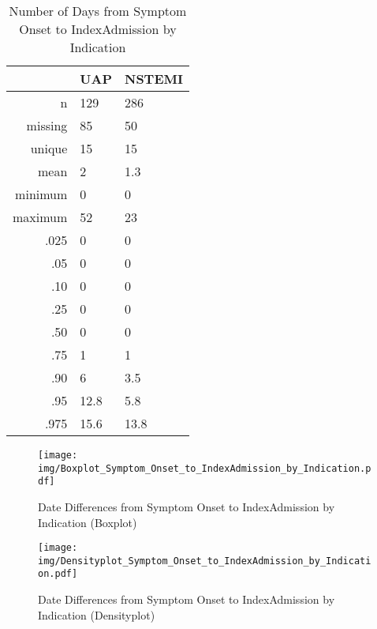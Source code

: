 \documentclass[presentation,xcolor=pdftex,dvipsnames,table,11pt]{beamer}
\begin{document}
\begin{tiny}
\begin{table}[ht]
\centering
\begin{tabular}{rll}
  \toprule
 & UAP & NSTEMI \\ 
  \midrule
n & 129 & 286 \\ 
  missing & 85 & 50 \\ 
  unique & 15 & 15 \\ 
  mean & 2 & 1.3 \\ 
  minimum & 0 & 0 \\ 
  maximum & 52 & 23 \\ 
  .025 & 0 & 0 \\ 
  .05 & 0 & 0 \\ 
  .10 & 0 & 0 \\ 
  .25 & 0 & 0 \\ 
  .50 & 0 & 0 \\ 
  .75 & 1 & 1 \\ 
  .90 & 6 & 3.5 \\ 
  .95 & 12.8 & 5.8 \\ 
  .975 & 15.6 & 13.8 \\ 
   \bottomrule
\end{tabular}
\caption{Number of Days from Symptom Onset to IndexAdmission by Indication} 
\end{table}
\begin{frame}
\begin{figure}
  \centering
  \caption{Date Differences from Symptom Onset to IndexAdmission by Indication (Boxplot)}
  \label{Boxplot: Date Differences from Symptom Onset to IndexAdmission by Indication}
\texttt{[image: img/Boxplot\_Symptom\_Onset\_to\_IndexAdmission\_by\_Indication.pdf]}\end{figure}
\end{frame}


\begin{frame}
\begin{figure}
  \centering
  \caption{Date Differences from Symptom Onset to IndexAdmission by Indication (Densityplot)}
  \label{Density: Date Differences from Symptom Onset to IndexAdmission by Indication}
\texttt{[image: img/Densityplot\_Symptom\_Onset\_to\_IndexAdmission\_by\_Indication.pdf]}\end{figure}
\end{frame}





\end{tiny}
\end{document}

